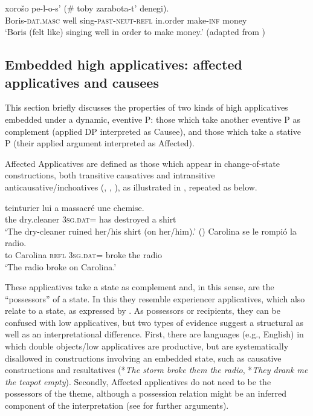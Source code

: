 \documentclass[output=paper,colorlinks,citecolor=brown,nonflat]{./langscibook}
\begin{document}
\ea%
    \label{ex:cuervo:11}
     {xorošo} {pe-l-o-s’} {(\# {toby}} {zarabota-t’} {denegi).}\\
    Boris-\textsc{dat.masc}   well sing-\textsc{past-neut-refl} in.order make-\textsc{inf} money\\
    \glt ‘Boris (felt like) singing well in order to make money.’   (adapted from \citealt[189]{Skorniakova2009})
    \z

\subsection{Embedded high applicatives: affected applicatives and causees}\label{sec:cuervo:4.3}

This section briefly discusses the properties of two kinds of high applicatives embedded under a dynamic, eventive \liv P: those which take another eventive \iv P as complement (applied DP interpreted as Causee), and those which take a stative \liv P (their applied argument interpreted as Affected). 

Affected Applicatives are defined as those which appear in change-of-state constructions, both transitive causatives and intransitive anticausative/inchoatives (\citealt{Cuervo2003}, \citeyear{Cuervo2010Probus}, \citeyear{Cuervo2015Syntax}), as illustrated in , repeated as  below. 

\ea%
    \label{ex:cuervo:12}
    \ea%
        \label{ex:cuervo:12a}
         {teinturier} {lui} {a} {massacré} {une} {chemise.}\\
        the dry.cleaner 3\textsc{sg.dat}= has destroyed a shirt\\
        \glt ‘The dry-cleaner ruined her/his shirt (on her/him).’  (\citealt{BonehNash2012})
    \ex%
        \label{ex:cuervo:12b}
         {Carolina} {se} {le} {rompió} {la} {radio}.\\
        to Carolina  \textsc{refl} 3\textsc{sg.dat}=   broke the radio\\
        \glt ‘The radio broke on Carolina.’
    \z
\z

These applicatives take a state as complement and, in this sense, are the “possessors” of a state. In this they resemble experiencer applicatives, which also relate to a state, as expressed by .  As possessors or recipients, they can be confused with low applicatives, but two types of evidence suggest a structural as well as an interpretational difference. First, there are languages (e.g., English) in which double objects/low applicatives are productive, but are systematically disallowed in constructions involving an embedded state, such as causative constructions and resultatives (*\textit{The storm broke them the radio}, *\textit{They drank me the teapot empty}). Secondly, Affected applicatives do not need to be the possessors of the theme, although a possession relation might be an inferred component of the interpretation (see \citealt{Cuervo2003} for further arguments). 
\end{document}
